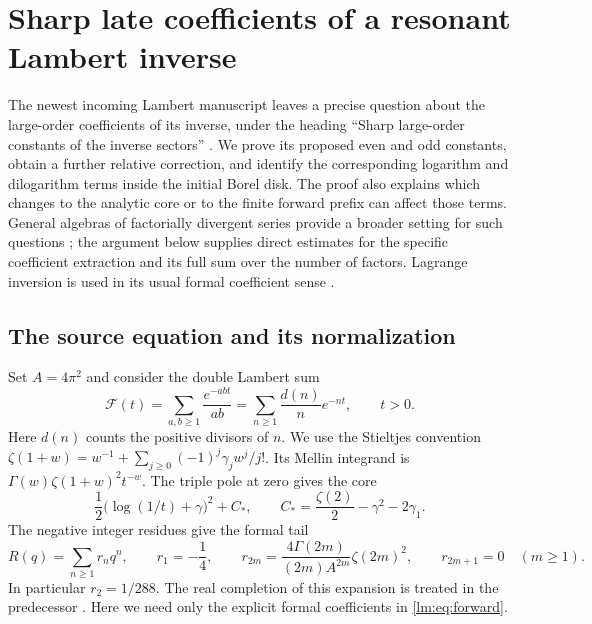 \section{Sharp late coefficients of a resonant Lambert inverse}
\label{lm:sec:main}

The newest incoming Lambert manuscript leaves a precise question about the
large-order coefficients of its inverse, under the heading ``Sharp
large-order constants of the inverse sectors'' \cite{RepoLambert}.
We prove its proposed even and odd constants, obtain a further relative
correction, and identify the corresponding logarithm and dilogarithm terms
inside the initial Borel disk.  The proof also explains which changes to
the analytic core or to the finite forward prefix can affect those terms.
General algebras of factorially divergent series provide a broader setting
for such questions \cite{Borinsky}; the argument below supplies direct
estimates for the specific coefficient extraction and its full sum over
the number of factors.  Lagrange inversion is used in its usual formal
coefficient sense \cite{Gessel}.

\subsection{The source equation and its normalization}
\label{lm:subsec:normalization}

Set $A=4\pi^2$ and consider the double Lambert sum
\[
 \mathcal F(t)=\sum_{a,b\geq1}\frac{e^{-abt}}{ab}
              =\sum_{n\geq1}\frac{d(n)}{n}e^{-nt},\qquad t>0.
\]
Here $d(n)$ counts the positive divisors of $n$. We use the Stieltjes
convention $\zeta(1+w)=w^{-1}+\sum_{j\ge0}(-1)^j\gamma_jw^j/j!$.
Its Mellin integrand is $\Gamma(w)\zeta(1+w)^2t^{-w}$.  The triple pole
at zero gives the core
\[
 \frac12\bigl(\log(1/t)+\gamma\bigr)^2+C_* ,
 \qquad C_* =\frac{\zeta(2)}2-\gamma^2-2\gamma_1.
\]
The negative integer residues give the formal tail
\begin{equation}\label{lm:eq:forward}
 R(q)=\sum_{n\geq1}r_nq^n,\qquad
 r_1=-\frac14,\qquad
 r_{2m}=\frac{4\Gamma(2m)}{(2m)A^{2m}}\zeta(2m)^2,
 \qquad r_{2m+1}=0\quad(m\geq1).
\end{equation}
In particular $r_2=1/288$.  The real completion of this expansion is
treated in the predecessor \cite{RepoLambert}.  Here we need only the
explicit formal coefficients in \eqref{lm:eq:forward}.

